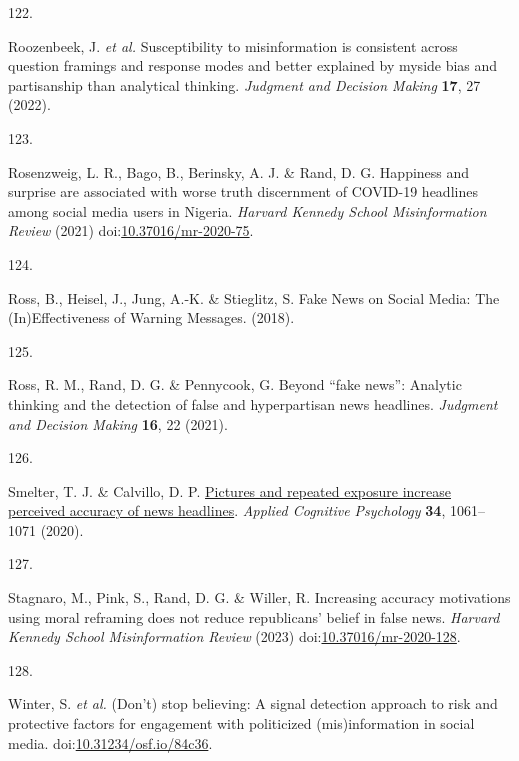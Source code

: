 \documentclass[
  doc,floatsintext]{apa6}
\newlength{\cslhangindent}
\newlength{\csllabelwidth}
\newenvironment{CSLReferences}[2] %
 {\begin{list}{}{%
  \setlength{\itemindent}{0pt}
  \setlength{\leftmargin}{0pt}
  \setlength{\parsep}{0pt}
  \ifodd #1
   \setlength{\leftmargin}{\cslhangindent}
   \setlength{\itemindent}{-1\cslhangindent}
  \fi
  \setlength{\itemsep}{#2\baselineskip}}}
 {\end{list}}
\newcommand{\CSLLeftMargin}[1]{\parbox[t]{\csllabelwidth}{\strut#1\strut}}
\newcommand{\CSLRightInline}[1]{\parbox[t]{\linewidth - \csllabelwidth}{\strut#1\strut}}
\begin{document}
\begin{CSLReferences}{0}{0}
\CSLLeftMargin{122. }%
\CSLRightInline{*Roozenbeek, J. \emph{et al.} Susceptibility to misinformation is consistent across question framings and response modes and better explained by myside bias and partisanship than analytical thinking. \emph{Judgment and Decision Making} \textbf{17}, 27 (2022).}

\CSLLeftMargin{123. }%
\CSLRightInline{*Rosenzweig, L. R., Bago, B., Berinsky, A. J. \& Rand, D. G. Happiness and surprise are associated with worse truth discernment of COVID-19 headlines among social media users in Nigeria. \emph{Harvard Kennedy School Misinformation Review} (2021) doi:\href{https://doi.org/10.37016/mr-2020-75}{10.37016/mr-2020-75}.}

\CSLLeftMargin{124. }%
\CSLRightInline{*Ross, B., Heisel, J., Jung, A.-K. \& Stieglitz, S. Fake News on Social Media: The (In)Effectiveness of Warning Messages. (2018).}

\CSLLeftMargin{125. }%
\CSLRightInline{*Ross, R. M., Rand, D. G. \& Pennycook, G. Beyond {``}fake news{''}: Analytic thinking and the detection of false and hyperpartisan news headlines. \emph{Judgment and Decision Making} \textbf{16}, 22 (2021).}

\CSLLeftMargin{126. }%
\CSLRightInline{*Smelter, T. J. \& Calvillo, D. P. \href{https://doi.org/10.1002/acp.3684}{Pictures and repeated exposure increase perceived accuracy of news headlines}. \emph{Applied Cognitive Psychology} \textbf{34}, 1061--1071 (2020).}

\CSLLeftMargin{127. }%
\CSLRightInline{*Stagnaro, M., Pink, S., Rand, D. G. \& Willer, R. Increasing accuracy motivations using moral reframing does not reduce republicans{'} belief in false news. \emph{Harvard Kennedy School Misinformation Review} (2023) doi:\href{https://doi.org/10.37016/mr-2020-128}{10.37016/mr-2020-128}.}

\CSLLeftMargin{128. }%
\CSLRightInline{*Winter, S. \emph{et al.} (Don{'}t) stop believing: A signal detection approach to risk and protective factors for engagement with politicized (mis)information in social media. doi:\href{https://doi.org/10.31234/osf.io/84c36}{10.31234/osf.io/84c36}.}


\end{CSLReferences}
\end{document}
